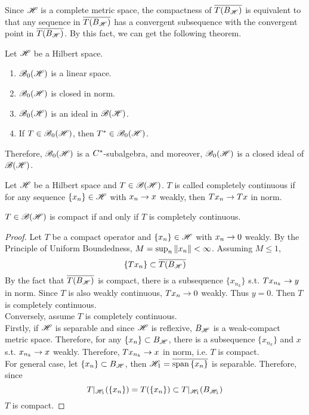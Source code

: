 Since $\mathscr{H}$ is a complete metric space, the compactness of $\overline{T(B_{\mathscr{H}})}$ is equivalent to that any sequence in $\overline{T(B_{\mathscr{H}})}$ has a convergent subsequence with the convergent point in $\overline{T(B_{\mathscr{H}})}$. By this fact, we can get the following theorem.

\begin{thm}
	Let $\mathscr{H}$ be a Hilbert space.
	\begin{enumerate}[label=\arabic*)]
		\item $\mathscr{B}_{0}\mathscr{(H)}$ is a linear space.
		\item $\mathscr{B}_{0}\mathscr{(H)}$ is closed in norm.
		\item $\mathscr{B}_{0}\mathscr{(H)}$ is an ideal in $\mathscr{B(H)}$.
		\item If $T \in \mathscr{B}_{0}\mathscr{(H)}$, then $T^{*} \in \mathscr{B}_{0}\mathscr{(H)}$.
	\end{enumerate}
\end{thm}
\begin{rem}
	Therefore, $\mathscr{B}_{0}\mathscr{(H)}$ is a $C^{*}$-subalgebra, and moreover, $\mathscr{B}_{0}\mathscr{(H)}$ is a closed ideal of $\mathscr{B(H)}$.
\end{rem}

\begin{defn}
	Let $\mathscr{H}$ be a Hilbert space and $T \in \mathscr{B(H)}$. $T$ is called completely continuous if for any sequence $\{x_n\} \in \mathscr{H}$ with $x_n \rightarrow x$ weakly, then $Tx_n \rightarrow Tx$ in norm.
\end{defn}

\begin{prop}
	$T \in \mathscr{B(H)}$ is compact if and only if $T$ is completely continuous. 
\end{prop}
\begin{proof}
	Let $T$ be a compact operator and $\{x_n\} \in \mathscr{H}$ with $x_n \rightarrow 0$ weakly. By the Principle of Uniform Boundedness, $M = \sup_n{\left\lVert x_n\right\lVert} < \infty$. Assuming $M \leqslant 1$,
	\begin{equation*}
		\{Tx_n\} \subset \overline{T(B_{\mathscr{H}})}
	\end{equation*}
	By the fact that $\overline{T(B_{\mathscr{H}})}$ is compact, there is a subsequence $\{x_{n_k}\}$ s.t. $Tx_{n_k}  \rightarrow y$ in norm. Since $T$ is also weakly continuous, $Tx_n \rightarrow 0$ weakly. Thus $y = 0$. Then $T$ is completely continuous.\\
	Conversely, assume $T$ is completely continuous. \\
	Firstly, if $\mathscr{H}$ is separable and since $\mathscr{H}$ is reflexive, $B_{\mathscr{H}}$ is a weak-compact metric space. Therefore, for any $\{x_n\} \subset B_{\mathscr{H}}$, there is a subsequence $\{x_{n_k}\}$ and $x$ s.t. $x_{n_k} \rightarrow x$ weakly. Therefore, $Tx_{n_k} \rightarrow x$ in norm, i.e. $T$ is compact.\\
	For general case, let $\{x_n\} \subset B_{\mathscr{H}}$, then $\mathscr{H}_1 = \overline{\operatorname{span}{\{x_n\}}}$ is separable. Therefore, since
	\begin{equation*}
		T|_{\mathscr{H}_1}(\{x_n\}) = T(\{x_n\}) \subset T|_{\mathscr{H}_1}(B_{\mathscr{H}_1})
	\end{equation*}
	$T$ is compact.
\end{proof}

